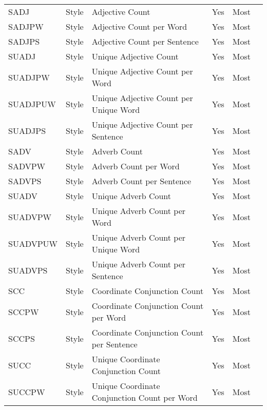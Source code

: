 \begin{longtable}{l l m{} c c m{}}
    SADJ & Style & Adjective Count & Yes & Most & \cite{Bassani2019_lr359} \\
    SADJPW & Style & Adjective Count per Word & Yes & Most & \cite{Bassani2019_lr359} \\
    SADJPS & Style & Adjective Count per Sentence & Yes & Most & \cite{Bassani2019_lr359} \\
    SUADJ & Style & Unique Adjective Count & Yes & Most & \cite{Lewoniewski2018_lr149, Bassani2019_lr359} \\
    SUADJPW & Style & Unique Adjective Count per Word & Yes & Most & \cite{Bassani2019_lr359} \\
    SUADJPUW & Style & Unique Adjective Count per Unique Word & Yes & Most & \cite{Bassani2019_lr359} \\
    SUADJPS & Style & Unique Adjective Count per Sentence & Yes & Most & \cite{Bassani2019_lr359} \\
    SADV & Style & Adverb Count & Yes & Most & \cite{Bassani2019_lr359} \\
    SADVPW & Style & Adverb Count per Word & Yes & Most & \cite{Bassani2019_lr359} \\
    SADVPS & Style & Adverb Count per Sentence & Yes & Most & \cite{Bassani2019_lr359} \\
    SUADV & Style & Unique Adverb Count & Yes & Most & \cite{Bassani2019_lr359} \\
    SUADVPW & Style & Unique Adverb Count per Word & Yes & Most & \cite{Bassani2019_lr359} \\
    SUADVPUW & Style & Unique Adverb Count per Unique Word & Yes & Most & \cite{Bassani2019_lr359} \\
    SUADVPS & Style & Unique Adverb Count per Sentence & Yes & Most & \cite{Bassani2019_lr359} \\
    SCC & Style & Coordinate Conjunction Count & Yes & Most & \cite{Bassani2019_lr359, Dalip2014_lr1004, Magalhaes2019_lr2028} \\
    SCCPW & Style & Coordinate Conjunction Count per Word & Yes & Most & \cite{Dalip2009_lr14, Anderka2012_lr17, Wang2020_lr26, Wang2019_lr74, Ferretti2012_lr115, Pereyra2019_lr147, Bassani2019_lr359, Dalip2011_lr1003} \\
    SCCPS & Style & Coordinate Conjunction Count per Sentence & Yes & Most & \cite{Xu2011_lr30, Bassani2019_lr359} \\
    SUCC & Style & Unique Coordinate Conjunction Count & Yes & Most & \cite{Bassani2019_lr359} \\
    SUCCPW & Style & Unique Coordinate Conjunction Count per Word & Yes & Most & \cite{Bassani2019_lr359} \\

\end{longtable}
